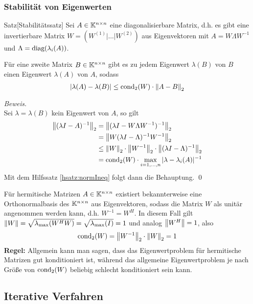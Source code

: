 \subsubsection{Stabilität von Eigenwerten}

\begin{colbox}{Satz}[Stabilitätssatz]
  Sei $A\in\mathbb K^{n\times n}$ eine diagonalisierbare Matrix, d.h. es gibt eine invertierbare Matrix 
  $W=(W^{(1)}|\dots|W^{(2)})$ aus Eigenvektoren mit $A=W\Lambda W^{-1}$ und $\Lambda=\text{diag}(\lambda_i(A))$.
  
  Für eine zweite Matrix $B\in\mathbb K^{n\times n}$ gibt es zu 
  jedem Eigenwert $\lambda(B)$ von $B$ einen Eigenwert $\lambda(A)$ von $A$, sodass
  \begin{align*}
    |\lambda(A)-\lambda(B)|\leq\Cond_2(W)\cdot\vertn{2}{A-B}_2
  \end{align*}
\end{colbox}

\textit{Beweis.} \\
Sei $\lambda=\lambda(B)$ kein Eigenwert von $A$, so gilt 
%
\begin{align*}
  \vertn{2}{(\lambda I - A)^{-1}}_2 
  &= \vertn{2}{(\lambda I - W\Lambda W^{-1})^{-1}}_2 \\
  &= \vertn{2}{W(\lambda I - \Lambda)^{-1}W^{-1}}_2 \\
  &\leq \vertn{2}{W}_2\cdot\vertn{2}{W^{-1}}_2\cdot\vertn{2}{(\lambda I-\Lambda)^{-1}}_2\\
  &= \Cond_2(W)\cdot \max_{i=1,\dots,n} |\lambda-\lambda_i(A)|^{-1}
\end{align*}
%
Mit dem Hilfssatz \ref{hsatz:normIneq} folgt dann die Behauptung. 
\qed 

Für hermitische Matrizen $A\in\mathbb K^{n\times n}$ existiert bekannterweise eine Orthonormalbasis des 
$\mathbb K^{n\times n}$ aus Eigenvektoren, sodass die Matrix $W$ als unitär angenommen werden kann, 
d.h. $W^{-1}=W^H$. In diesem Fall gilt $\vertn{2}{W} = \sqrt{\lambda_{\max}(W^HW)} = \sqrt{\lambda_{\max}(I)}=1$
und analog $\vertn{2}{W^H} = 1$, also 
%
\begin{align*}
  \Cond_2(W)=\vertn{2}{W^{-1}}_2\cdot\vertn{2}{W}_2 = 1
\end{align*}
%
\textbf{Regel:} Allgemein kann man sagen, dass das Eigenwertproblem für hermitische Matrizen gut konditioniert
ist, während das allgemeine Eigenwertproblem je nach Größe von $\text{cond}_2(W)$ beliebig schlecht konditioniert 
sein kann.

\subsection{Iterative Verfahren}

